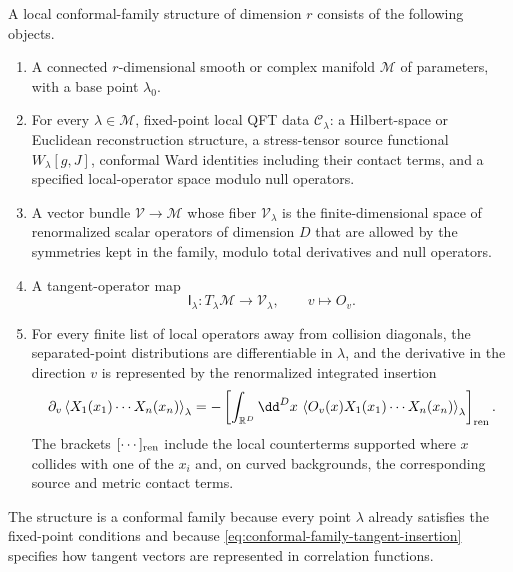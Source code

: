 \begin{definition}
\label{def:local-conformal-family-datum}
A local conformal-family structure of dimension \(r\) consists of the following
objects.
\begin{enumerate}
  \item A connected \(r\)-dimensional smooth or complex manifold
  \(\mathcal M\) of parameters, with a base point \(\lambda_0\).
  \item For every \(\lambda\in\mathcal M\), fixed-point local QFT data
  \(\mathcal C_\lambda\): a Hilbert-space or Euclidean reconstruction structure,
  a stress-tensor source functional \(W_\lambda[g,J]\), conformal Ward
  identities including their contact terms, and a specified local-operator
  space modulo null operators.
  \item A vector bundle \(\mathcal V\to\mathcal M\) whose fiber
  \(\mathcal V_\lambda\) is the finite-dimensional space of renormalized
  scalar operators of dimension \(D\) that are allowed by the symmetries kept
  in the family, modulo total derivatives and null operators.
  \item A tangent-operator map
  \[
    \mathsf I_\lambda:T_\lambda\mathcal M\longrightarrow\mathcal V_\lambda,
    \qquad
    v\longmapsto O_v .
  \]
  \item For every finite list of local operators away from collision
  diagonals, the separated-point distributions are differentiable in
  \(\lambda\), and the derivative in the direction \(v\) is represented by
  the renormalized integrated insertion
  \begin{equation}
    \partial_v
    \left\langle X_1(x_1)\cdots X_n(x_n)\right\rangle_{\lambda}
    =
    -\left[
      \int_{\mathbb R^D}\dd^D x\,
      \left\langle
        O_v(x)X_1(x_1)\cdots X_n(x_n)
      \right\rangle_{\lambda}
    \right]_{\rm ren}.
    \label{eq:conformal-family-tangent-insertion}
  \end{equation}
  The brackets \([\cdots]_{\rm ren}\) include the local counterterms supported
  where \(x\) collides with one of the \(x_i\) and, on curved backgrounds, the
  corresponding source and metric contact terms.
\end{enumerate}
The structure is a conformal family because every point \(\lambda\) already
satisfies the fixed-point conditions and because
\eqref{eq:conformal-family-tangent-insertion} specifies how tangent vectors
are represented in correlation functions.
\end{definition}

